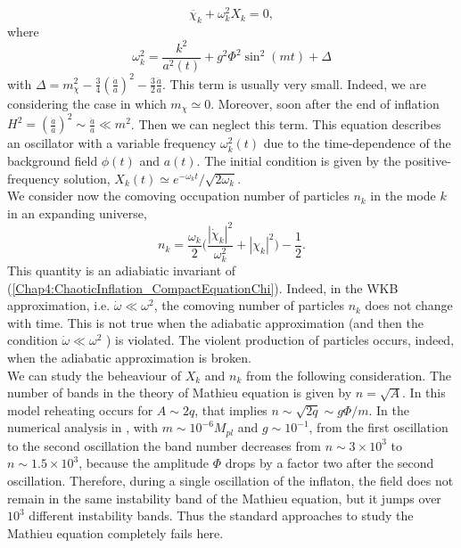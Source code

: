 \documentclass[11pt,a4paper,twoside]{book}
\begin{document}
\begin{equation}
	\label{Chap4:ChaoticInflation_CompactEquationChi}
	\ddot{\chi_{k}} + \omega_{k}^{2}X_{k} = 0,
\end{equation}
where 
\begin{equation}
	\label{Chap4:ChaoticInflation_Omega_k}
	\omega_{k}^{2}=\frac{k^{2}}{a^{2}(t)} + g^{2}\Phi^{2}\sin^{2}(mt) + \Delta
\end{equation}
with $ \Delta=m_{\chi}^{2}-\frac{3}{4}(\frac{\dot{a}}{a})^{2}-\frac{3}{2}\frac{\ddot{a}}{a} $. This term is usually very small. Indeed, we are considering the case in which $ m_{\chi}\simeq 0 $. Moreover,  soon after the end of inflation $ H^{2}=(\frac{\dot{a}}{a})^{2}\sim \frac{\ddot{a}}{a} \ll m^{2} $. Then we can neglect this term. This equation describes an oscillator with a variable frequency $ \omega_{k}^{2}(t) $ due to the time-dependence of the background field $\phi(t)$ and $ a(t) $. The initial condition is given by the positive-frequency solution, $ X_{k}(t) \simeq e^{-\omega_{k}t}/\sqrt{2\omega_{k}} $.\\
We consider now the comoving occupation number of particles $ n_{k} $ in the mode $ k $ in an expanding universe,
\begin{equation}
	\label{Chap4:comovNumberParticles}
	n_{k}=\frac{\omega_{k}}{2}\Bigg(\frac{|\dot{\chi}_{k}|^{2}}{\omega^{2}_{k}} + |\chi_{k}|^{2}\Bigg) - \frac{1}{2}.
\end{equation}
This quantity is an adiabiatic invariant of (\ref{Chap4:ChaoticInflation_CompactEquationChi}). Indeed, in the WKB approximation, i.e. $\dot{\omega} \ll \omega^{2}$, the comoving number of particles $ n_{k} $ does not change with time. This is not true when the adiabatic approximation (and then the condition $\dot{\omega} \ll \omega^{2}$ ) is violated. The violent production of particles occurs, indeed, when the adiabatic approximation is broken.\\
We can study the beheaviour of $ X_{k} $ and $ n_{k} $ from the following consideration. The number of bands in the theory of Mathieu equation is given by $ n=\sqrt{A} $. In this model reheating occurs for $ A\sim 2q $, that implies $ n\sim\sqrt{2q}\sim g\Phi/m $. In the numerical analysis in \cite{Chap4:LindePreheatingModel}, with $ m\sim 10^{-6} M_{pl} $ and $ g\sim 10^{-1} $, from the first oscillation to the second oscillation the band number decreases from $ n \sim 3 \times 10^{3} $ to $ n\sim 1.5 \times 10^{3} $, because the amplitude $\Phi$ drops by a factor two after the second oscillation. Therefore, during a single oscillation of the inflaton, the field does not remain in the same instability band of the Mathieu equation, but it jumps over $ 10^{3} $ different instability bands. Thus the standard approaches to study the Mathieu equation completely fails here.\\
\end{document}
